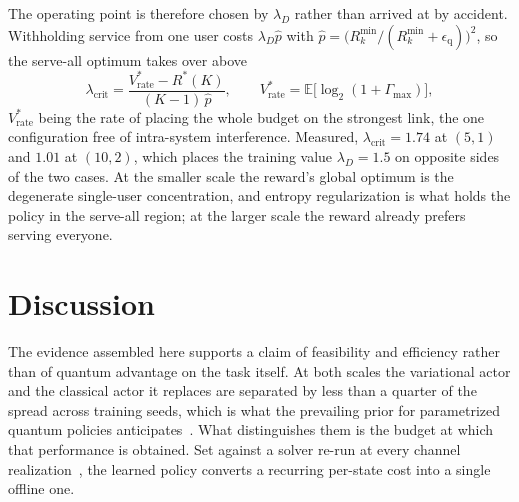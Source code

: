 \documentclass[12pt,onecolumn]{IEEEtran}
\newif\iffull
\begin{document}
The operating point is therefore chosen by $\lambda_D$ rather than arrived at by accident.
Withholding service from one user costs $\lambda_D\hat{p}$ with
$\hat{p}=\bigl(R_k^{\min}/(R_k^{\min}+\epsilon_{\mathrm q})\bigr)^2$, so the serve-all optimum
takes over above
\begin{equation}
\lambda_{\mathrm{crit}}
= \frac{V^*_{\mathrm{rate}} - R^*(K)}{(K-1)\,\hat{p}},
\qquad
V^*_{\mathrm{rate}} = \mathbb{E}\bigl[\log_2(1+\Gamma_{\max})\bigr],
\label{eq:lcrit}
\end{equation}
$V^*_{\mathrm{rate}}$ being the rate of placing the whole budget on the strongest link, the
one configuration free of intra-system interference. Measured,
$\lambda_{\mathrm{crit}}=1.74$ at $(5,1)$ and $1.01$ at $(10,2)$, which places the training
value $\lambda_D=1.5$ on opposite sides of the two cases. At the smaller scale the reward's
global optimum is the degenerate single-user concentration, and entropy regularization is
what holds the policy in the serve-all region; at the larger scale the reward already prefers
serving everyone.

\iffull
That the reward optimum sits below full service follows from the penalty rather than from any
shortage of power. Its marginal cost $2\lambda_D t/(R_k^{\min}+\epsilon_{\mathrm q})^2$
vanishes as the shortfall $t\to0$, so the reward-optimal common-rate split is a water-filling
solution, the shares solving $\sum_{k\in\mathcal{K}_g}(\varsigma_k-t^\star)^+ = R_{c,g}$ for a
common level $t^\star$, which settles the weakest users marginally below their demand. Full
service and reward optimality are therefore separate targets at every $\lambda_D$, and the
comparison in Fig.~\ref{fig:pareto} is made at matched service for that reason.
\fi

\section{Discussion}
\label{sec:discussion}

The evidence assembled here supports a claim of feasibility and efficiency rather than of
quantum advantage on the task itself. At both scales the variational actor and the classical
actor it replaces are separated by less than a quarter of the spread across training seeds,
which is what the prevailing prior for parametrized quantum policies
anticipates~\cite{jerbi2021parametrized,bowles2024better}. What distinguishes them is the budget at which
that performance is obtained. Set against a solver re-run at
every channel realization~\cite{tan2025flexible}, the learned policy converts a recurring
per-state cost into a single offline one.
\end{document}
